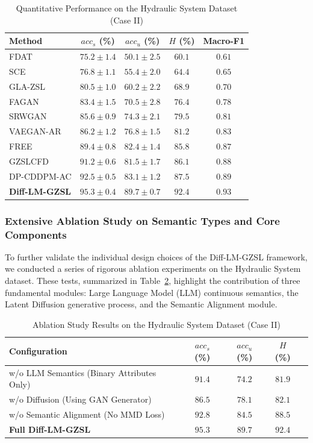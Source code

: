 \begin{table}[htbp]
\centering
\caption{Quantitative Performance on the Hydraulic System Dataset (Case II)}
\label{tab:hydraulic_results}
\begin{tabular}{lcccc}
\hline
Method & $acc_s$ (\%) & $acc_u$ (\%) & $H$ (\%) & Macro-F1 \\
\hline
FDAT & $75.2 \pm 1.4$ & $50.1 \pm 2.5$ & $60.1$ & $0.61$ \\
SCE & $76.8 \pm 1.1$ & $55.4 \pm 2.0$ & $64.4$ & $0.65$ \\
GLA-ZSL & $80.5 \pm 1.0$ & $60.2 \pm 2.2$ & $68.9$ & $0.70$ \\
FAGAN & $83.4 \pm 1.5$ & $70.5 \pm 2.8$ & $76.4$ & $0.78$ \\
SRWGAN & $85.6 \pm 0.9$ & $74.3 \pm 2.1$ & $79.5$ & $0.81$ \\
VAEGAN-AR & $86.2 \pm 1.2$ & $76.8 \pm 1.5$ & $81.2$ & $0.83$ \\
FREE & $89.4 \pm 0.8$ & $82.4 \pm 1.4$ & $85.8$ & $0.87$ \\
GZSLCFD & $91.2 \pm 0.6$ & $81.5 \pm 1.7$ & $86.1$ & $0.88$ \\
DP-CDDPM-AC & $92.5 \pm 0.5$ & $83.1 \pm 1.2$ & $87.5$ & $0.89$ \\
\textbf{Diff-LM-GZSL} & $\mathbf{95.3 \pm 0.4}$ & $\mathbf{89.7 \pm 0.7}$ & $\mathbf{92.4}$ & $\mathbf{0.93}$ \\
\hline
\end{tabular}
\end{table}

\subsubsection{Extensive Ablation Study on Semantic Types and Core Components}
To further validate the individual design choices of the Diff-LM-GZSL framework, we conducted a series of rigorous ablation experiments on the Hydraulic System dataset. These tests, summarized in Table~\ref{tab:ablation}, highlight the contribution of three fundamental modules: Large Language Model (LLM) continuous semantics, the Latent Diffusion generative process, and the Semantic Alignment module.

\begin{table}[htbp]
\centering
\caption{Ablation Study Results on the Hydraulic System Dataset (Case II)}
\label{tab:ablation}
\begin{tabular}{lcccc}
\hline
Configuration & $acc_s$ (\%) & $acc_u$ (\%) & $H$ (\%) \\
\hline
w/o LLM Semantics (Binary Attributes Only) & $91.4$ & $74.2$ & $81.9$ \\
w/o Diffusion (Using GAN Generator) & $86.5$ & $78.1$ & $82.1$ \\
w/o Semantic Alignment (No MMD Loss) & $92.8$ & $84.5$ & $88.5$ \\
\textbf{Full Diff-LM-GZSL} & $\mathbf{95.3}$ & $\mathbf{89.7}$ & $\mathbf{92.4}$ \\
\hline
\end{tabular}
\end{table}

